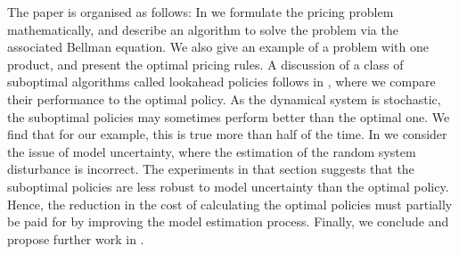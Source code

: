 \documentclass[main.tex]{subfiles}
\begin{document}
The paper is organised as follows:
In  we formulate the
pricing problem mathematically, and describe an algorithm to solve the
problem via the associated Bellman equation. We also give an example
of a problem with one product, and present the optimal pricing rules.
A discussion of a class of suboptimal
algorithms called lookahead policies follows in
, where we compare their performance to
the optimal policy. As the dynamical system is stochastic, the
suboptimal policies may sometimes perform better than the optimal
one. We find that for our example, this is  true more than half of
the time.
In  we consider the issue of
model uncertainty, where the estimation of the random system
disturbance is incorrect. The experiments in that section suggests
that the suboptimal policies are less robust to model uncertainty
than the optimal policy. Hence, the reduction in the cost
of calculating the optimal policies must partially be paid for
by improving the model estimation process.
Finally, we conclude and propose further work in .

\biblio
\end{document}

